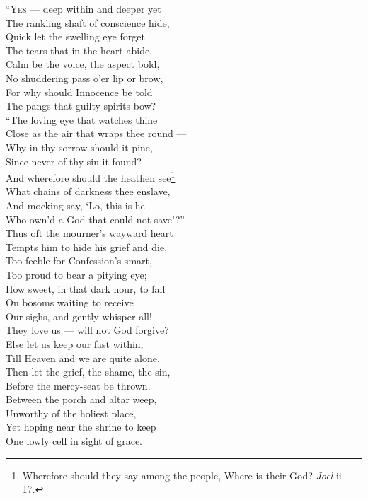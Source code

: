 “\textsc{Yes} — deep within and deeper yet \\
 The rankling shaft of conscience hide, \\
 Quick let the swelling eye forget \\
 The tears that in the heart abide. \\
 Calm be the voice, the aspect bold, \\
 No shuddering pass o’er lip or brow, \\
 For why should Innocence be told \\
 The pangs that guilty spirits bow? \\
  “The loving eye that watches thine \\
 Close as the air that wraps thee round — \\
 Why in thy sorrow should it pine, \\
 Since never of thy sin it found? \\
 And wherefore should the heathen see\footnote{Wherefore should they say among the people, Where is their God? \emph{Joel} ii. 17.} \\
 What chains of darkness thee enslave, \\
 And mocking say, ‘Lo, this is he \\
 Who own’d a God that could not save’?” \\
  Thus oft the mourner’s wayward heart \\
 Tempts him to hide his grief and die, \\
 Too feeble for Confession’s smart, \\
 Too proud to bear a pitying eye; \\
 How sweet, in that dark hour, to fall \\
 On bosoms waiting to receive \\
 Our sighs, and gently whisper all! \\
 They love us — will not God forgive? \\
  Else let us keep our fast within, \\
 Till Heaven and we are quite alone, \\
 Then let the grief, the shame, the sin, \\
 Before the mercy-seat be thrown. \\
 Between the porch and altar weep, \\
 Unworthy of the holiest place, \\
 Yet hoping near the shrine to keep \\
 One lowly cell in sight of grace. \\
